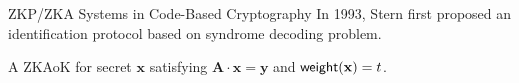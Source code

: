 \begin{frame}{ZKP/ZKA Systems in Code-Based Cryptography}
	In 1993, Stern first proposed an identification protocol \cite{Stern93} based on syndrome decoding problem.
	
	A ZKAoK for secret $\mathbf{x}$ satisfying $\mathbf{A}\cdot\mathbf{x} = \mathbf{y}$ and $\mathsf{weight}(\mathbf{x}) = t$. 
\end{frame}